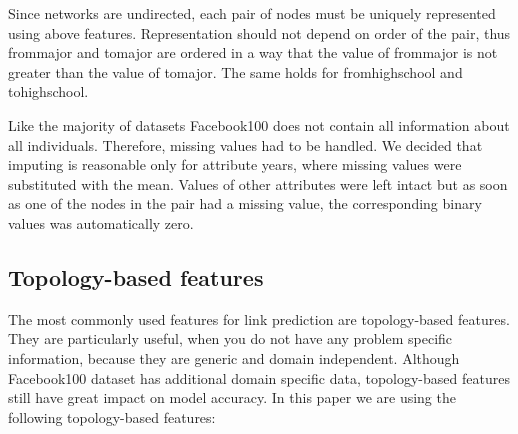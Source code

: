 \documentclass[9pt,twocolumn,twoside]{pnas-new}
\begin{document}
Since networks are undirected, each pair of nodes must be uniquely represented using above features. Representation should not depend on order of the pair, thus from\textunderscore major and to\textunderscore major are ordered in a way that the value of from\textunderscore major is not greater than the value of to\textunderscore major. The same holds for from\textunderscore high\textunderscore school and to\textunderscore high\textunderscore school.

Like the majority of datasets Facebook100 does not contain all information about all individuals. Therefore, missing values had to be handled. We decided that imputing is reasonable only for attribute years, where missing values were substituted with the mean. Values of other attributes were left intact but as soon as one of the nodes in the pair had a missing value, the corresponding binary values was automatically zero. 




\subsection*{Topology-based features}

The most commonly used features for link prediction are topology-based features. They are particularly useful, when you do not have any problem specific information, because they are generic and domain independent. Although Facebook100 dataset has additional domain specific data, topology-based features still have great impact on model accuracy. In this paper we are using the following topology-based features:
\end{document}
